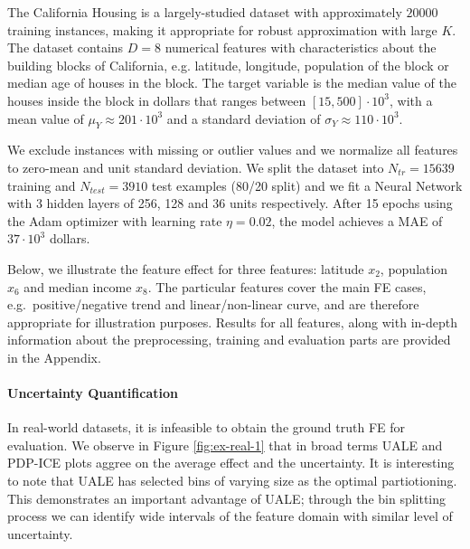 \documentclass[twoside]{article}
\begin{document}
The California Housing is a largely-studied dataset with approximately
\(20000\) training instances, making it appropriate for robust
approximation with large \(K\). The dataset contains \(D=8\) numerical
features with characteristics about the building blocks of California,
e.g. latitude, longitude, population of the block or median age of
houses in the block. The target variable is the median value of the
houses inside the block in dollars that ranges between
\([15, 500] \cdot 10^3\), with a mean value of
\(\mu_Y \approx 201 \cdot 10^3 \) and a standard deviation of
\(\sigma_Y \approx 110 \cdot 10^3\).

We exclude instances with missing or outlier values and we normalize
all features to zero-mean and unit standard deviation. We split the
dataset into \(N_{tr} = 15639\) training and \(N_{test} = 3910\) test
examples (80/20 split) and we fit a Neural Network with 3 hidden
layers of 256, 128 and 36 units respectively. After 15 epochs using
the Adam optimizer with learning rate \(\eta = 0.02\), the model
achieves a MAE of \(37 \cdot 10^3\) dollars.

Below, we illustrate the feature effect for three features: latitude
\(x_2\), population \(x_6\) and median income \(x_8\). The particular
features cover the main FE cases, e.g.~positive/negative trend and
linear/non-linear curve, and are therefore appropriate for
illustration purposes. Results for all features, along with in-depth
information about the preprocessing, training and evaluation parts are
provided in the Appendix.

\paragraph{Uncertainty Quantification}

In real-world datasets, it is infeasible to obtain the ground truth FE
for evaluation. We observe in Figure \ref{fig:ex-real-1} that in broad
terms UALE and PDP-ICE plots aggree on the average effect and the
uncertainty. It is interesting to note that UALE has selected bins of
varying size as the optimal partiotioning. This demonstrates an
important advantage of UALE; through the bin splitting process we can
identify wide intervals of the feature domain with similar level of
uncertainty.

\end{document}
